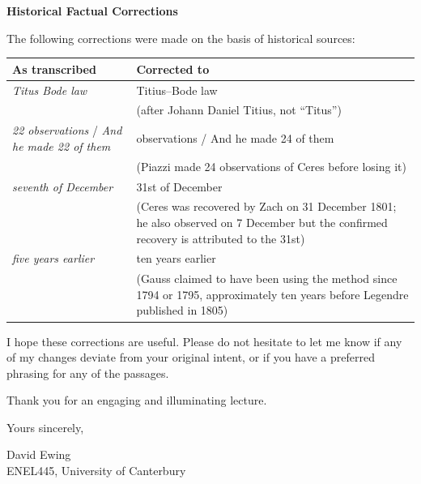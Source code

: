 \documentclass[11pt,a4paper]{article}
\begin{document}
\vspace{0.6em}
\textbf{\large Historical Factual Corrections}
\vspace{0.3em}

The following corrections were made on the basis of historical sources:

\renewcommand{\arraystretch}{1.35}
\begin{tabular}{>{\raggedright\arraybackslash}p{}
                >{\raggedright\arraybackslash}p{}}
\toprule
\textbf{As transcribed} & \textbf{Corrected to} \\
\midrule
\textit{Titus Bode law} & Titius--Bode law \\
 & (after Johann Daniel Titius, not ``Titus'') \\[0.3em]
\textit{22 observations} / \textit{And he made 22 of them} & 24 observations / And he made 24 of them \\
 & (Piazzi made 24 observations of Ceres before losing it) \\[0.3em]
\textit{seventh of December} & 31st of December \\
 & (Ceres was recovered by Zach on 31 December 1801; he also observed on 7 December but the confirmed recovery is attributed to the 31st) \\[0.3em]
\textit{five years earlier} & ten years earlier \\
 & (Gauss claimed to have been using the method since 1794 or 1795, approximately ten years before Legendre published in 1805) \\
\bottomrule
\end{tabular}

\vspace{1.2em}

I hope these corrections are useful. Please do not hesitate to let me know if any of my changes deviate from your original intent, or if you have a preferred phrasing for any of the passages.

Thank you for an engaging and illuminating lecture.

\vspace{1.8em}

Yours sincerely,

\vspace{1.4em}

David Ewing\\
ENEL445, University of Canterbury
\end{document}
